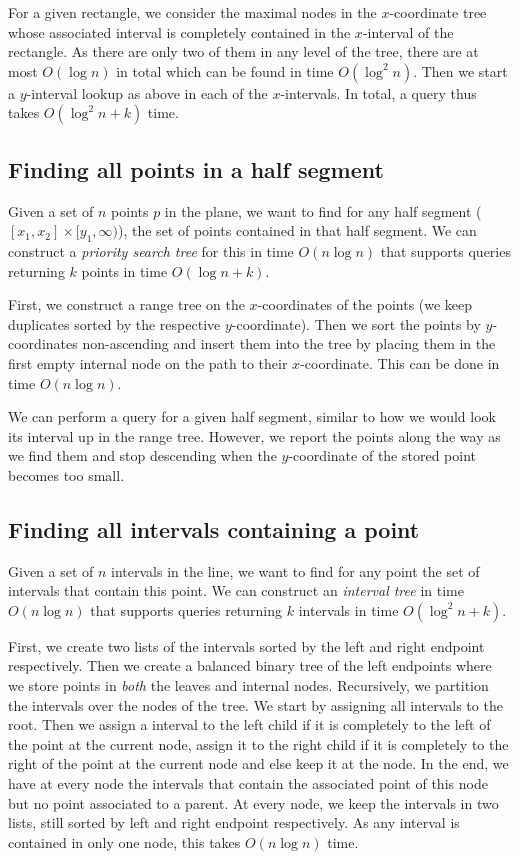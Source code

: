 \documentclass[11pt, a4paper, twocolumn]{article}
\begin{document}
For a given rectangle, we consider the maximal nodes in the $x$-coordinate tree whose associated
interval is completely contained in the $x$-interval of the rectangle. As there are only two of
them in any level of the tree, there are at most $O(\log n)$ in total which can be found in time $O(\log^2 n)$.
Then we start a $y$-interval lookup as above in each of the $x$-intervals. In total, a query thus
takes $O(\log^2 n + k)$ time.

\subsection{Finding all points in a half segment}

Given a set of $n$ points $p$ in the plane, we want to find for any half segment
($[x_1, x_2] \times [y_1, \infty)$), the set
of points contained in that half segment. We can construct a \textit{priority search tree}
for this in time $O(n \log n)$ that supports queries returning $k$ points in time $O(\log n + k)$.

First, we construct a range tree on the $x$-coordinates of the points (we keep duplicates
sorted by the respective $y$-coordinate). Then we sort the points by $y$-coordinates non-ascending
and insert them into the tree by placing them in the first empty internal node on the path
to their $x$-coordinate. This can be done in time $O(n \log n)$.

We can perform a query for a given half segment, similar to how we would look its
interval up in the range tree. However, we report the points along the way as we
find them and stop descending when the $y$-coordinate of the stored point becomes
too small.

\subsection{Finding all intervals containing a point}

Given a set of $n$ intervals in the line, we want to find for any point the
set of intervals that contain this point. We can construct an \textit{interval tree}
in time $O(n \log n)$ that supports queries returning $k$ intervals in time $O(\log^2 n + k)$.

First, we create two lists of the intervals sorted by the left and right endpoint respectively.
Then we create a balanced binary tree of the left endpoints where we store points in \textit{both}
the leaves and internal nodes. Recursively, we partition the intervals over the nodes of the tree.
We start by assigning all intervals to the root. Then we assign a interval to the left child if
it is completely to the left of the point at the current node, assign it to the right child if
it is completely to the right of the point at the current node and else keep it at the node.
In the end, we have at every node the intervals that contain the associated point of this node but no
point associated to a parent. At every node, we keep the intervals in two lists,
still sorted by left and right endpoint respectively. As any interval is contained in only one node,
this takes $O(n \log n)$ time.
\end{document}
